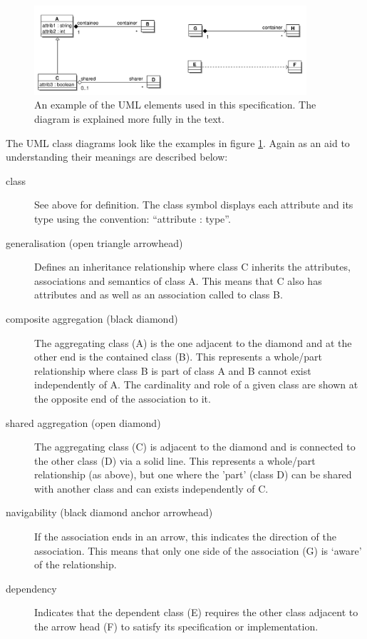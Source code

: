 %
\begin{figure}[htb]
\begin{center}
\includegraphics[width=0.9\textwidth]{images/exampleuml}
\caption{An example of the UML elements used in this
  specification. The diagram is explained more fully in the text.}
\label{fig:techref:umlexample}
\end{center}
\end{figure}
%
The UML class diagrams look like the examples in
figure \ref{fig:techref:umlexample}. Again as an aid to
understanding their meanings are described below:
\begin{description}
\item[class] See above for definition. The class symbol displays each
  attribute and its type using the convention: ``attribute : type''.
\item[generalisation (open triangle arrowhead)] Defines an inheritance
  relationship where class C inherits the attributes, associations and
  semantics of class A. This means that C also has attributes
   and  as well as an association
called  to class B.
\item[composite aggregation (black diamond)] The aggregating class
  (A) is the one adjacent to the diamond and at the other end is the
  contained class (B). This represents a whole/part
  relationship where class B is part of class A and B cannot exist
  independently of A. The cardinality and role of a given class are
  shown at the opposite end of the association to it.
\item[shared aggregation (open diamond)] The aggregating class (C) is
  adjacent to the diamond and is connected to the other class (D) via
  a solid line. This represents a whole/part relationship (as above), but one
  where the 'part' (class D) can be shared with another class and can
  exists independently of C.
\item[navigability (black diamond anchor arrowhead)] If the
  association ends in an arrow, this indicates the direction of the
  association. This means that only one side of the association (G)
  is `aware' of the relationship.
\item[dependency] Indicates that the dependent class (E) requires the
  other class adjacent to the arrow head (F) to satisfy its
  specification or implementation.
\end{description}
